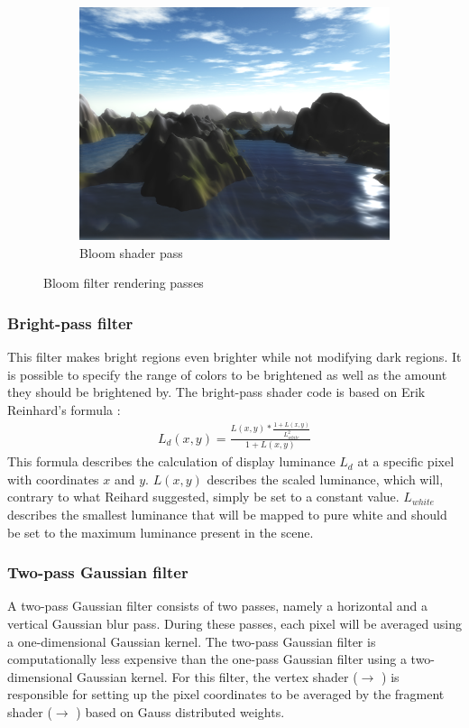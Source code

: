 \documentclass[11pt,a4paper,twoside,openright]{report}
\begin{document}
\begin{figure}[h]
\begin{subfigure}[b]{0.32\textwidth}
    \includegraphics[width=\textwidth]{shader4-bloom-screenshot.png}
    \caption{Bloom shader pass}
    \label{fig:5thpass}
  \end{subfigure}
  \caption{Bloom filter rendering passes}
\end{figure}

\subsubsection{Bright-pass filter}
This filter makes bright regions even brighter while not modifying dark regions. It is possible to specify the range of colors to be brightened as well as the amount they should be brightened by. The bright-pass shader code is based on Erik Reinhard's formula \cite{Reinhard:2002:PTR:566570.566575}:
\begin{align}
L_d(x,y) = \frac{L(x,y) * \frac{1 + L(x,y)}{L_{white}^2}}{1 + L(x,y)}
\end{align}
This formula describes the calculation of display luminance $L_d$ at a specific pixel with coordinates $x$ and $y$. $L(x,y)$ describes the scaled luminance, which will, contrary to what Reihard suggested, simply be set to a constant value. $L_{white}$ describes the smallest luminance that will be mapped to pure white and should be set to the maximum luminance present in the scene.

\subsubsection{Two-pass Gaussian filter}
A two-pass Gaussian filter consists of two passes, namely a horizontal and a vertical Gaussian blur pass. During these passes, each pixel will be averaged using a one-dimensional Gaussian kernel. The two-pass Gaussian filter is computationally less expensive than the one-pass Gaussian filter using a two-dimensional Gaussian kernel. For this filter, the vertex shader ($\rightarrow$ ) is responsible for setting up the pixel coordinates to be averaged by the fragment shader ($\rightarrow$ ) based on Gauss distributed weights.
\end{document}
